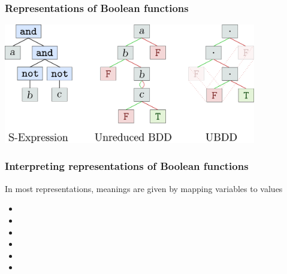 
\begin{frame}
\frametitle{Representations of Boolean functions}

\begin{center}
\includegraphics[width=11cm]{reps.png}
\end{center}

\end{frame}



\begin{frame}
\frametitle{Interpreting representations of Boolean functions}

In most representations, meanings are given by  mapping
variables to values

\begin{itemize}
\item {}
\item {}
\item {}
\item {}
\item {}
\item {}
\end{itemize}


\end{frame}



